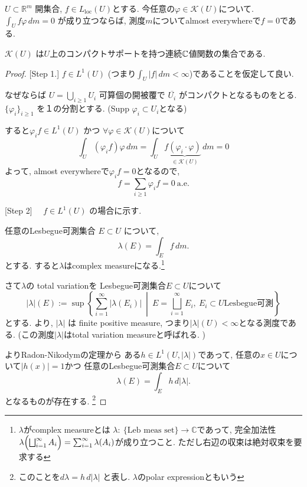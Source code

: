 \begin{tcolorbox}[mybox]
\begin{lem}
\(U \subset \mathbb{R}^m\) 開集合, \(f \in L_{\mathrm{loc}}(U)\)とする. 
今任意の$\varphi \in \mathcal{K}(U)$について. 
\(
\int_U f\varphi\, dm = 0 
\)
が成り立つならば,  測度\(m\)についてalmost everywhereで\(f=0\)である.
\end{lem}
\end{tcolorbox}
$ \mathcal{K}(U)$
は$U$上のコンパクトサポートを持つ連続$\mathbb{C}$値関数の集合である.
\begin{proof}

[Step 1.] 
\(f \in L^1(U)\) (つまり\(\int_U |f|\,dm < \infty\))であることを仮定して良い. 

なぜならば \(U=\bigcup_{i\geq 1} U_i\) 可算個の開被覆で
\(\overline{U_i}\) がコンパクトとなるものをとる. 
 \(\{\varphi_i\}_{i\geq 1}\) を１の分割とする. (Supp \(\varphi_i \subset U_i\)となる)

すると\(\varphi_i f \in L^1(U)\) かつ \(\forall \varphi \in \mathcal{K}(U)\)について
\[
\int_U (\varphi_i f)\varphi\,dm
=
\int_U f \underbrace{(\varphi_i\cdot \varphi)}_{\in \mathcal{K}(U)}\,dm
=
0
\]
よって, almost everywhereで$\varphi_i f=0$となるので, 
\[
f=\sum_{i\geq 1}\varphi_i f = 0 \ \text{a.e.}
\]

[Step 2] 
\(\quad f \in L^1(U)\) の場合に示す. 


任意のLesbegue可測集合 \(E \subset U\) について, 
\[
\lambda(E)=\int_E f\,dm.
\]
とする. すると\(\lambda\)はcomplex measureになる.\footnote{$\lambda$がcomplex measureとは
$\lambda:\ \{\text{Leb meas set}\}\to \mathbb{C}$であって, 完全加法性
$\lambda\Bigl(\bigsqcup_{i=1}^{\infty} A_i\Bigr)
=
\sum_{i=1}^{\infty}\lambda(A_i)$が成り立つこと. ただし右辺の収束は絶対収束を要求する}

さて$\lambda$の total variationを
Lesbegue可測集合\(E\subset U\)について
\[
|\lambda|(E):=\sup\left\{\sum_{i=1}^{\infty}|\lambda(E_i)|\ \middle|\ E=\bigsqcup_{i=1}^{\infty}E_i,\ E_i\subset U \text{Lesbegue可測}\right\}
\]
とする. 
\cite[Chapter 6]{Rud2}より,  \(|\lambda|\) は finite positive measure, つまり$|\lambda|(U)<\infty$となる測度である. (この測度$|\lambda|$はtotal variation measureと呼ばれる. )

\cite[Theorem 6.12]{Rud2}よりRadon-Nikodymの定理から
ある\( h \in L^1(U,|\lambda|)\)であって, 
任意の$x \in U$について\(
|h(x)|=1\)かつ
任意のLesbegue可測集合$E\subset U$について
\[
\lambda(E)=\int_E h\,d|\lambda|.
\]
となるものが存在する. \footnote{このことを$d\lambda = h\,d|\lambda|$
と表し. \(\lambda\)のpolar expressionともいう}


\end{proof}
